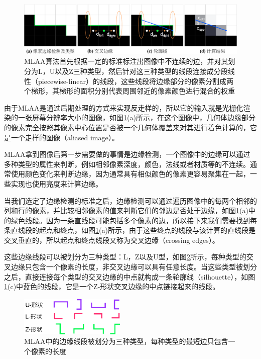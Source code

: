 \begin{figure}
\begin{fullwidth}
	\includegraphics[width=1.0\thewidth]{figures/shade/mlaa-09}
	\caption{MLAA算法首先根据一定的标准标注出图像中不连续的边，并对其划分为L，U以及Z三种类型，然后针对这三种类型的线段连接成分段线性（piecewise-linear）的线段，这些线段将边缘部分的像素分割成两个梯形，其梯形的面积分别代表周围邻近的像素颜色进行混合的权重}
	\label{f:shade-mlaa}
\end{fullwidth}
\end{figure}

由于MLAA是通过后期处理的方式来实现反走样的，所以它的输入就是光栅化渲染的一张屏幕分辨率大小的图像，如图\ref{f:shade-mlaa}(a)所示，在这个图像中，几何体边缘部分的像素完全按照其像素中心位置是否被一个几何体覆盖来对其进行着色计算的，它是一个走样的图像（aliased image）。

MLAA拿到图像后第一步需要做的事情是边缘检测，一个图像中的边缘可以通过多种类型的属性来判断，例如相邻像素深度，颜色，法线或者材质等的不连续。通常使用颜色变化来判断边缘，因为通常具有相似颜色的像素更容易聚集在一起，一些实现也使用亮度来计算边缘。

当我们选定了边缘检测的标准之后，边缘检测可以通过遍历图像中的每两个相邻的列和行的像素，并比较相邻像素的值来判断它们的邻边是否处于边缘，如图\ref{f:shade-mlaa}(a)中的绿色线段。因为一条直线段可能包括多个像素的边，所以接下来我们需要找到每条直线段的起点和终点，如图\ref{f:shade-mlaa}(a)所示，由于这些终点的线段与该计算的直线段是交叉垂直的，所以起点和终点线段又称为交叉边缘（crossing edges）。

这些边缘线段可以被划分为三种类型：L，Z以及U型，如图\ref{f:shade-edge-types}所示，每种类型的交叉边缘只包含一个像素的长度，非交叉边缘可以具有任意长度。当这些类型被划分之后，直接连接每个类型的交叉边缘的中点就构成一条轮廓线（silhouette），如图\ref{f:shade-mlaa}(c)中蓝色的线段，它是一个Z-形状交叉边缘的中点链接起来的线段。

\begin{figure}
	\sidecaption
	\includegraphics[width=0.45\textwidth]{figures/shade/edge-types}
	\caption{MLAA中的边缘线段被划分为三种类型，每种类型的最短边只包含一个像素的长度}
	\label{f:shade-edge-types}
\end{figure}

